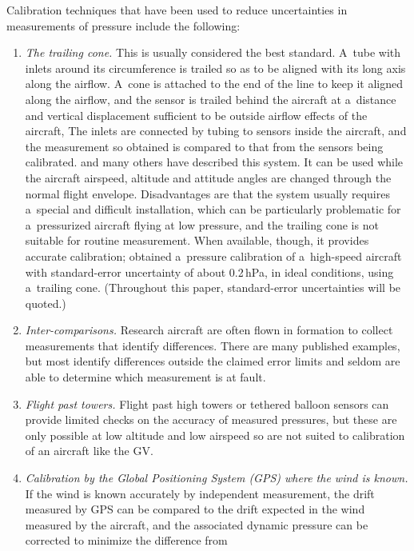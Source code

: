 \documentclass[amtd, online, hvmath]{copernicus}
\begin{document}
Calibration techniques that have been used to reduce uncertainties in
measurements of pressure include the following:
\begin{enumerate}
\item \textit{The trailing cone.} This is usually considered the best
  standard.  A~tube with inlets around its circumference is trailed so
  as to be aligned with its long axis along the airflow. A~cone is
  attached to the end of the line to keep it aligned
  along the airflow, and the sensor is trailed behind the aircraft at
  a~distance and vertical displacement sufficient to be outside
  airflow effects of the aircraft, The inlets are connected by tubing
  to sensors inside the aircraft, and the measurement so obtained is
  compared to that from the sensors being
  calibrated. \citet{IkhtiariMarth1964} and many others have described
  this system. It can be used while the aircraft airspeed, altitude
  and attitude angles are changed through the normal flight
  envelope. Disadvantages are that the system usually requires
  a~special and difficult installation, which can be particularly
  problematic for a~pressurized aircraft flying at low pressure, and
  the trailing cone is not suitable for routine measurement. When
  available, though, it provides accurate calibration;
  \citet{BrownTN1988} obtained a~pressure calibration of a~high-speed
  aircraft with standard-error uncertainty of about 0.2\,\unit{hPa},
  in ideal conditions, using a~trailing cone. (Throughout this paper,
  standard-error uncertainties will be quoted.)
\item \textit{Inter-comparisons.} Research aircraft are often flown in
  formation to collect measurements that identify differences. There
  are many published examples, but most identify differences outside
  the claimed error limits and seldom are able to determine which
  measurement is at fault.
\item \textit{Flight past towers.} Flight past high towers or tethered
  balloon sensors can provide limited checks on the accuracy of
  measured pressures, but these are only possible at low altitude and
  low airspeed so are not suited to calibration of an aircraft like
  the GV.
\item \textit{Calibration by the Global Positioning System (GPS) where
    the wind is known.} If the wind is known accurately by independent
  measurement, the drift measured by GPS can be compared to the drift
  expected in the wind measured by the aircraft, and the associated
  dynamic pressure can be corrected to minimize the difference from

\end{enumerate}
\end{document}
